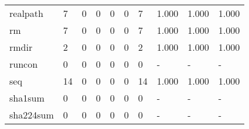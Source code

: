 \begin{longtable}{lp{1.3cm}p{1.3cm}p{1.3cm}p{1.3cm}p{1.3cm}p{1.3cm}p{1.3cm}p{1.3cm}p{1.3cm}}
realpath  &                      7 &                                  0 &                                 0 &                                0 &                                 0 &                               7 &                                1.000 &                                  1.000 &                                1.000 \\
rm        &                      7 &                                  0 &                                 0 &                                0 &                                 0 &                               7 &                                1.000 &                                  1.000 &                                1.000 \\
rmdir     &                      2 &                                  0 &                                 0 &                                0 &                                 0 &                               2 &                                1.000 &                                  1.000 &                                1.000 \\
runcon    &                      0 &                                  0 &                                 0 &                                0 &                                 0 &                               0 &                                    - &                                      - &                                    - \\
seq       &                     14 &                                  0 &                                 0 &                                0 &                                 0 &                              14 &                                1.000 &                                  1.000 &                                1.000 \\
sha1sum   &                      0 &                                  0 &                                 0 &                                0 &                                 0 &                               0 &                                    - &                                      - &                                    - \\
sha224sum &                      0 &                                  0 &                                 0 &                                0 &                                 0 &                               0 &                                    - &                                      - &                                    - \\

\end{longtable}
